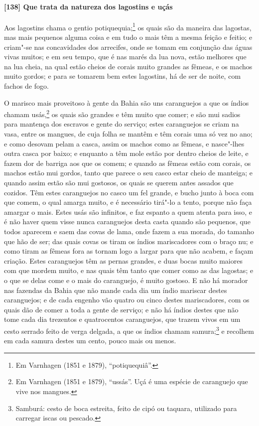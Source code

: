 \paragraph{[138] Que trata da natureza dos lagostins e uçás}\quad
Aos lagostins chama o gentio potiquequia;\footnote{ Em Varnhagen (1851 e 1879),
``potiquequiâ''.} os quais são da maneira das lagostas, mas mais pequenos alguma coisa e
em tudo o mais têm a mesma feição e feitio; e criam"-se nas concavidades dos arrecifes,
onde se tomam em conjunção das águas vivas muitos; e em seu tempo, que é nas marés da lua
nova, estão melhores que na lua cheia, na qual estão cheios de corais muito grandes as
fêmeas, e os machos muito gordos; e para se tomarem bem estes lagostins, há de ser de
noite, com fachos de fogo.

O marisco mais proveitoso à gente da Bahia são uns caranguejos a que os índios chamam
usás,\footnote{ Em Varnhagen (1851 e 1879), ``ussás''. Uçá é uma espécie de caranguejo que
vive nos mangues.} os quais são grandes e têm muito que comer; e são mui sadios para
mantença dos escravos e gente do serviço; estes caranguejos se criam na vasa, entre os
mangues, de cuja folha se mantêm e têm corais uma só vez no ano; e como desovam pelam a
casca, assim os machos como as fêmeas, e nasce"-lhes outra casca por baixo; e enquanto a
têm mole estão por dentro cheios de leite, e fazem dor de barriga aos que os comem; e
quando as fêmeas estão com corais, os machos estão mui gordos, tanto que parece o seu
casco estar cheio de manteiga; e quando assim estão são mui gostosos, os quais se querem
antes assados que cozidos. Têm estes caranguejos no casco um fel grande, e bucho junto à
boca com que comem, o qual amarga muito, e é necessário tirá"-lo a tento, porque não faça
amargar o mais. Estes usás são infinitos, e faz espanto a quem atenta para isso, e é não
haver quem visse nunca caranguejos desta casta quando são pequenos, que todos aparecem e
saem das covas de lama, onde fazem a sua morada, do tamanho que hão de ser; das quais
covas os tiram os índios mariscadores com o braço nu; e como tiram as fêmeas fora as
tornam logo a largar para que não acabem, e façam criação. Estes caranguejos têm as pernas
grandes, e duas bocas muito maiores com que mordem muito, e nas quais têm tanto que comer
como as das lagostas; e o que se delas come e o mais do caranguejo, é muito gostoso. E não
há morador nas fazendas da Bahia que não mande cada dia um índio mariscar destes
caranguejos; e de cada engenho vão quatro ou cinco destes mariscadores, com os quais dão
de comer a toda a gente de serviço; e não há índios destes que não tome cada dia trezentos
e quatrocentos caranguejos, que trazem vivos em um cesto serrado feito de verga delgada, a
que os índios chamam samura;\footnote{ Samburá: cesto de boca estreita, feito de cipó ou
taquara, utilizado para carregar iscas ou pescado.} e recolhem em cada samura destes um
cento, pouco mais ou menos.

